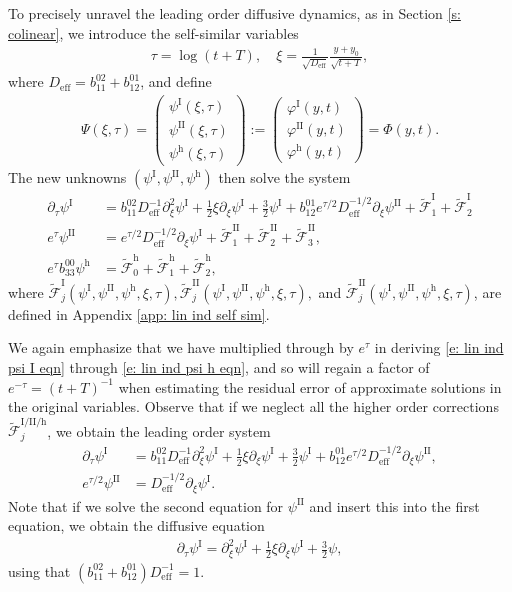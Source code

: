 \documentclass[11pt]{article}
\renewcommand{\phi}{\varphi}
\numberwithin{equation}{section}
\numberwithin{prop}{section}
\newcommand{\phih}{\phi^\mathrm{h}}
\newcommand{\psih}{\psi^\mathrm{h}}
\newcommand{\Deff}{D_\mathrm{eff}}
\newcommand{\phiI}{\phi^\mathrm{I}}
\newcommand{\phiII}{\phi^\mathrm{II}}
\newcommand{\tfi}{\tilde{\mathcal{F}}^\mathrm{I}}
\newcommand{\tfii}{\tilde{\mathcal{F}}^\mathrm{II}}
\newcommand{\tfh}{\tilde{\mathcal{F}}^\mathrm{h}}
\newcommand{\psiI}{\psi^\mathrm{I}}
\newcommand{\psiII}{\psi^\mathrm{II}}
\begin{document}
To precisely unravel the leading order diffusive dynamics, as in Section \ref{s: colinear}, we introduce the self-similar variables
\begin{align}
\tau = \log (t+T), \quad \xi = \frac{1}{\sqrt{\Deff}} \frac{y+y_0}{\sqrt{t+T}},
\end{align}
where $\Deff = b_{11}^{02} + b_{12}^{01}$, and define 
\begin{align}
\Psi(\xi, \tau) = \begin{pmatrix}
\psiI (\xi, \tau) \\ \psiII(\xi, \tau) \\ \psih(\xi, \tau) 
\end{pmatrix}
:= 
\begin{pmatrix}
\phiI(y,t) \\
\phiII(y,t) \\
\phih(y,t) 
\end{pmatrix} = \Phi(y,t).
\end{align}
The new unknowns $(\psiI, \psiII, \psih)$ then solve the system
\begin{align}
\partial_\tau \psiI &= b_{11}^{02} \Deff^{-1} \partial_\xi^2 \psiI+ \frac{1}{2} \xi \partial_\xi \psiI + \frac{3}{2} \psiI + b_{12}^{01} e^{\tau/2} \Deff^{-1/2} \partial_\xi \psiII + \tfi_1 + \tfi_2 \label{e: lin ind psi I eqn} \\
e^{\tau} \psiII &= e^{\tau/2} \Deff^{-1/2} \partial_\xi \psiI + \tfii_1 + \tfii_2 + \tfii_3, \label{e: lin ind psi II eqn} \\
e^\tau b_{33}^{00} \psih &= \tfh_0 + \tfh_1 + \tfh_2, \label{e: lin ind psi h eqn}
\end{align}
where $\tfi_j(\psiI, \psiII, \psih, \xi, \tau), \tfii_j(\psiI, \psiII, \psih, \xi, \tau),$ and $\tfii_j(\psiI, \psiII, \psih, \xi, \tau)$, are defined in Appendix \ref{app: lin ind self sim}. 

We again emphasize that we have multiplied through by $e^{\tau}$ in deriving \eqref{e: lin ind psi I eqn} through \eqref{e: lin ind psi h eqn}, and so will regain a factor of $e^{-\tau} = (t+T)^{-1}$ when estimating the residual error of approximate solutions in the original variables. Observe that if we neglect all the higher order corrections $\tilde{\mathcal{F}}^\mathrm{I/II/h}_j$, we obtain the leading order system
\begin{align*}
\partial_\tau \psiI &= b_{11}^{02} \Deff^{-1} \partial_\xi^2  \psiI + \frac{1}{2} \xi \partial_\xi \psiI + \frac{3}{2} \psiI + b_{12}^{01} e^{\tau/2} \Deff^{-1/2} \partial_\xi \psiII, \\
e^{\tau/2} \psiII &= \Deff^{-1/2} \partial_\xi \psiI. 
\end{align*}
Note that if we solve the second equation for $\psiII$ and insert this into the first equation, we obtain the diffusive equation
\begin{align}
\partial_\tau \psiI = \partial_\xi^2 \psiI + \frac{1}{2} \xi \partial_\xi \psiI+ \frac{3}{2} \psi,
\end{align}
using that $(b_{11}^{02} + b_{12}^{01}) \Deff^{-1} = 1$. 
\end{document}
